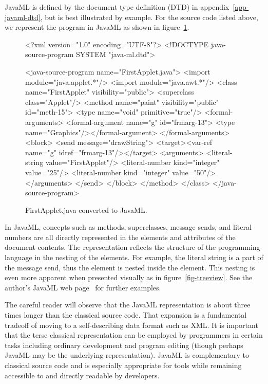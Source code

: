 \documentclass{article}
\begin{document}
\begin{multicols}{2}
JavaML is defined by the document type definition (DTD) in
appendix~\ref{app-javaml-dtd}, but is best illustrated by example.  For the
 source code listed above, we represent the
program in JavaML as shown in figure~\ref{fig-firstapplet-javaml}.

\begin{figure}[p]
\begin{listing}{1}
<?xml version="1.0" encoding="UTF-8"?>
<!DOCTYPE java-source-program SYSTEM "java-ml.dtd">

<java-source-program name="FirstApplet.java">
  <import module="java.applet.*"/>
  <import module="java.awt.*"/>
  <class name="FirstApplet" visibility="public">
    <superclass class="Applet"/>
    <method name="paint" visibility="public" id="meth-15">
      <type name="void" primitive="true"/>
      <formal-arguments>
         <formal-argument name="g" id="frmarg-13">
             <type name="Graphics"/></formal-argument>
      </formal-arguments>
      <block>
        <send message="drawString">
          <target><var-ref name="g" idref="frmarg-13"/></target>
            <arguments>
              <literal-string value="FirstApplet"/>
              <literal-number kind="integer" value="25"/>
              <literal-number kind="integer" value="50"/>
            </arguments>
        </send>
      </block>
    </method>
  </class>
</java-source-program>
\end{listing}
\caption{FirstApplet.java converted to JavaML.
\label{fig-firstapplet-javaml}}
\end{figure}

In JavaML, concepts such as methods, superclasses, message
sends, and literal numbers are all directly represented in the elements
and attributes of the document contents.  The representation reflects the
structure of the programming language in the nesting of the elements.
For example, the literal string  is a part of the message
send, thus the  element is nested inside the
 element.  This nesting is even more apparent when
presented visually as in figure~\ref{fig-treeview}. See
 the author's JavaML web page~\cite{Badros-javaml}
for further examples.

The careful reader will observe that the JavaML representation is about
three times longer than the classical source code.  That expansion is a
fundamental tradeoff of moving to a self-describing data format such as
XML.  It is important that the terse classical representation can be
employed by programmers in certain tasks including ordinary development
and program editing (though perhaps JavaML may be the underlying
representation).  JavaML is complementary to classical source
code and is especially appropriate for tools while remaining
accessible to and directly readable by developers.



\end{multicols}
\end{document}
